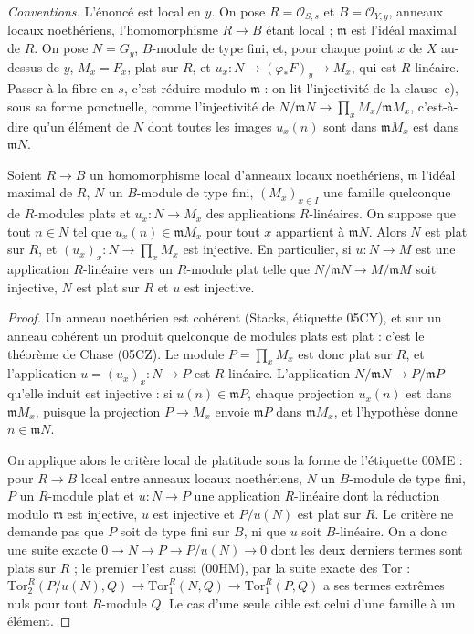 \noindent\emph{Conventions.} L'énoncé est local en $y$. On pose $R = \mathcal O_{S,s}$ et $B = \mathcal O_{Y,y}$, anneaux locaux noethériens, l'homomorphisme $R \to B$ étant local ; $\mathfrak m$ est l'idéal maximal de $R$. On pose $N = G_y$, $B$-module de type fini, et, pour chaque point $x$ de $X$ au-dessus de $y$, $M_x = F_x$, plat sur $R$, et $u_x : N \to (\varphi_*F)_y \to M_x$, qui est $R$-linéaire. Passer à la fibre en $s$, c'est réduire modulo $\mathfrak m$ : on lit l'injectivité de la clause~c), sous sa forme ponctuelle, comme l'injectivité de $N/\mathfrak m N \to \prod_x M_x/\mathfrak m M_x$, c'est-à-dire qu'un élément de $N$ dont toutes les images $u_x(n)$ sont dans $\mathfrak m M_x$ est dans $\mathfrak m N$.

\begin{encadre}
\begin{theoreme}\label{thm:49-local}
Soient $R \to B$ un homomorphisme local d'anneaux locaux noethériens, $\mathfrak m$ l'idéal maximal de $R$, $N$ un $B$-module de type fini, $(M_x)_{x \in I}$ une famille quelconque de $R$-modules plats et $u_x : N \to M_x$ des applications $R$-linéaires. On suppose que tout $n \in N$ tel que $u_x(n) \in \mathfrak m M_x$ pour tout $x$ appartient à $\mathfrak m N$. Alors $N$ est plat sur $R$, et $(u_x)_x : N \to \prod_x M_x$ est injective. En particulier, si $u : N \to M$ est une application $R$-linéaire vers un $R$-module plat telle que $N/\mathfrak m N \to M/\mathfrak m M$ soit injective, $N$ est plat sur $R$ et $u$ est injective.
\end{theoreme}
\end{encadre}

\begin{proof}
Un anneau noethérien est cohérent (Stacks, étiquette 05CY), et sur un anneau cohérent un produit quelconque de modules plats est plat : c'est le théorème de Chase (05CZ). Le module $P = \prod_x M_x$ est donc plat sur $R$, et l'application $u = (u_x)_x : N \to P$ est $R$-linéaire. L'application $N/\mathfrak m N \to P/\mathfrak m P$ qu'elle induit est injective : si $u(n) \in \mathfrak m P$, chaque projection $u_x(n)$ est dans $\mathfrak m M_x$, puisque la projection $P \to M_x$ envoie $\mathfrak m P$ dans $\mathfrak m M_x$, et l'hypothèse donne $n \in \mathfrak m N$.

On applique alors le critère local de platitude sous la forme de l'étiquette 00ME : pour $R \to B$ local entre anneaux locaux noethériens, $N$ un $B$-module de type fini, $P$ un $R$-module plat et $u : N \to P$ une application $R$-linéaire dont la réduction modulo $\mathfrak m$ est injective, $u$ est injective et $P/u(N)$ est plat sur $R$. Le critère ne demande pas que $P$ soit de type fini sur $B$, ni que $u$ soit $B$-linéaire. On a donc une suite exacte $0 \to N \to P \to P/u(N) \to 0$ dont les deux derniers termes sont plats sur $R$ ; le premier l'est aussi (00HM), par la suite exacte des $\mathrm{Tor}$ : $\mathrm{Tor}_2^R(P/u(N), Q) \to \mathrm{Tor}_1^R(N, Q) \to \mathrm{Tor}_1^R(P, Q)$ a ses termes extrêmes nuls pour tout $R$-module $Q$. Le cas d'une seule cible est celui d'une famille à un élément.
\end{proof}


